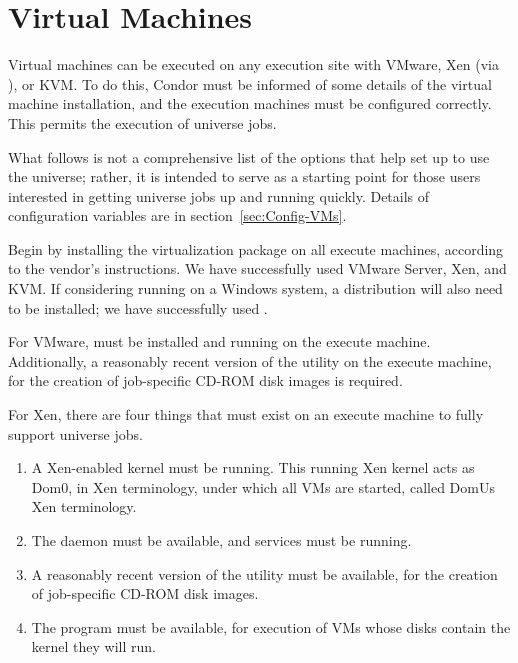 \section{\label{sec:vm-install}Virtual Machines}


Virtual machines can be executed on any execution site with VMware, Xen
(via ), or KVM.
To do this, Condor must be informed of some details of the 
virtual machine installation, and the execution machines must
be configured correctly.
This permits the execution of  universe jobs.

What follows is not a comprehensive list of the options that
help set up to use the  universe; rather,
it is intended to serve as a starting point for those users interested in
getting  universe jobs up and running quickly.
Details of configuration variables are in section~\ref{sec:Config-VMs}.

Begin by installing the virtualization package on all execute machines,
according to the vendor's instructions.
We have successfully used VMware Server, Xen, and KVM.
If considering running on a Windows system, 
a  distribution will also need to be installed;
we have successfully used . 

For VMware,  must be installed
and running on the execute machine.
Additionally, a reasonably
recent version of the  utility on the execute machine, for
the creation of job-specific CD-ROM disk images is required.

For Xen, there are four things that must exist on 
an execute machine to fully support  universe jobs. 
\begin{enumerate}
\item
A Xen-enabled kernel must be running. 
This running Xen kernel acts as Dom0, in Xen terminology, 
under which all VMs are started, called DomUs Xen terminology. 

\item
The  daemon must be available,
and  services must be running. 

\item
A reasonably recent version of the  utility must be available, 
for the creation of job-specific CD-ROM disk images. 

\item
The  program must be available,
for execution of VMs whose disks contain the kernel they will run.
\end{enumerate}

